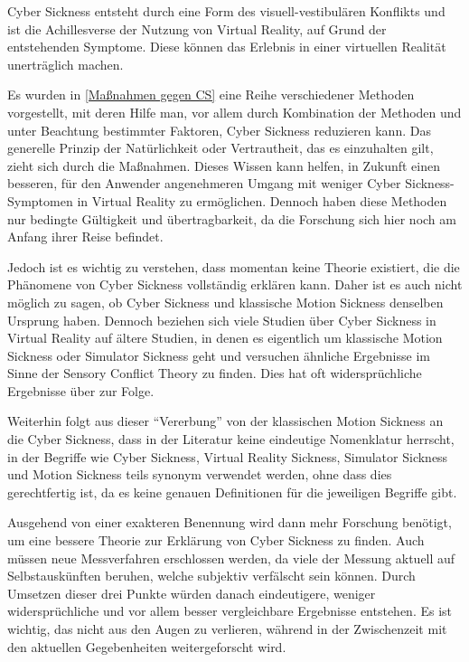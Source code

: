 Cyber Sickness entsteht durch eine Form des visuell-vestibul\"aren Konflikts und ist die Achillesverse der Nutzung von Virtual Reality, auf Grund der entstehenden Symptome. Diese k\"onnen das Erlebnis in einer virtuellen Realit\"at unertr\"aglich machen.

Es wurden in \autoref{Maßnahmen gegen CS} eine Reihe verschiedener Methoden vorgestellt, mit deren Hilfe man, vor allem durch Kombination der Methoden und unter Beachtung bestimmter Faktoren, Cyber Sickness reduzieren kann. Das generelle Prinzip der Nat\"urlichkeit oder Vertrautheit, das es einzuhalten gilt, zieht sich durch die Ma{\ss}nahmen.
Dieses Wissen kann helfen, in Zukunft einen besseren, f\"ur den Anwender angenehmeren Umgang mit weniger Cyber Sickness-Symptomen in Virtual Reality zu erm\"oglichen. Dennoch haben diese Methoden nur bedingte G\"ultigkeit und \"ubertragbarkeit, da die Forschung sich hier noch am Anfang ihrer Reise befindet.

Jedoch ist es wichtig zu verstehen, dass momentan keine Theorie existiert, die die Ph\"anomene von Cyber Sickness vollst\"andig erkl\"aren kann. Daher ist es auch nicht m\"oglich zu sagen, ob Cyber Sickness und klassische Motion Sickness denselben Ursprung haben. Dennoch beziehen sich viele Studien \"uber Cyber Sickness in Virtual Reality auf \"altere Studien, in denen es eigentlich um klassische Motion Sickness oder Simulator Sickness geht und versuchen \"ahnliche Ergebnisse im Sinne der Sensory Conflict Theory zu finden. Dies hat oft widerspr\"uchliche Ergebnisse \"uber zur Folge.


Weiterhin folgt aus dieser "`Vererbung"' von der klassischen Motion Sickness an die Cyber Sickness, dass in der Literatur keine eindeutige Nomenklatur herrscht, in der Begriffe wie Cyber Sickness, Virtual Reality Sickness, Simulator Sickness und Motion Sickness teils synonym verwendet werden, ohne dass dies gerechtfertig ist, da es keine genauen Definitionen f\"ur die jeweiligen Begriffe gibt.

Ausgehend von einer exakteren Benennung wird dann mehr Forschung ben\"otigt, um eine bessere Theorie zur Erkl\"arung von Cyber Sickness zu finden. Auch m\"ussen neue Messverfahren erschlossen werden, da viele der Messung aktuell auf Selbstausk\"unften beruhen, welche subjektiv verf\"alscht sein k\"onnen. Durch Umsetzen dieser drei Punkte w\"urden danach eindeutigere, weniger widerspr\"uchliche und vor allem besser vergleichbare Ergebnisse entstehen. Es ist wichtig, das nicht aus den Augen zu verlieren, w\"ahrend in der Zwischenzeit mit den aktuellen Gegebenheiten weitergeforscht wird.

